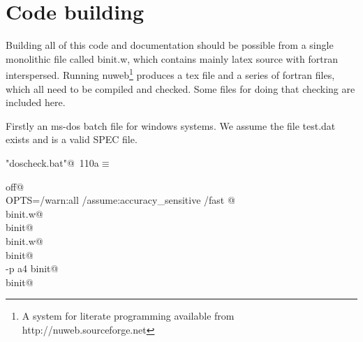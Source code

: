 \documentclass[10pt,a4paper,notitlepage]{article}
\begin{document}
\section{Code building}
Building all of this code and documentation should be possible from a single 
monolithic file called binit.w, which contains mainly latex source with 
fortran interspersed. 
Running nuweb\footnote{A system for literate programming
available from http://nuweb.sourceforge.net} 
produces a tex file and a series 
of fortran files, which all need to be compiled and checked. Some files for 
doing that checking are included here. 

Firstly an ms-dos batch file for windows systems. We assume the file test.dat
exists and is a valid SPEC file.

\begin{flushleft} \small
\begin{minipage}{\linewidth}\label{scrap133}\raggedright\small
{} \verb@"doscheck.bat"@\nobreak\ {\footnotesize {110a}}$\equiv$
\vspace{-1ex}
\begin{list}{}{} \item
\mbox{}\verb@echo off@\\
\mbox{}\verb@set OPTS=/warn:all /assume:accuracy_sensitive /fast  @\\
\mbox{}\verb@nuweb binit.w@\\
\mbox{}\verb@latex binit@\\
\mbox{}\verb@nuweb binit.w@\\
\mbox{}\verb@latex binit@\\
\mbox{}\verb@dvipdfm -p a4 binit@\\
\mbox{}\verb@dvips binit@\\
\mbox{}\verb@df %OPTS% /exe:id31sum.exe     id31sum.f90@\\
\mbox{}\verb@df %OPTS% /exe:id31sumall.exe  id31sumall.f90@\\
\mbox{}\verb@df %OPTS% /exe:id31offsets.exe id31offsets.f90      @\\
\mbox{}\verb@df %OPTS% /exe:sifit.exe       sifit.f90        @{\NWsep}
\end{list}
\vspace{-1.5ex}
\footnotesize
\begin{list}{}{\setlength{\itemsep}{-\parsep}\setlength{\itemindent}{-\leftmargin}}

\item{}
\end{list}
\end{minipage}\vspace{4ex}
\end{flushleft}
\end{document}
